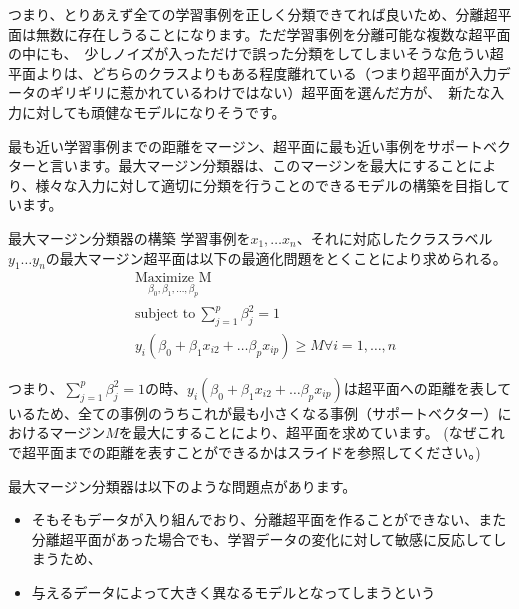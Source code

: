 \documentclass[uplatex]{jsarticle}
\begin{document}
つまり、とりあえず全ての学習事例を正しく分類できてれば良いため、分離超平面は無数に存在しうることになります。ただ学習事例を分離可能な複数な超平面の中にも、\
少しノイズが入っただけで誤った分類をしてしまいそうな危うい超平面よりは、どちらのクラスよりもある程度離れている（つまり超平面が入力データのギリギリに惹かれているわけではない）超平面を選んだ方が、\
新たな入力に対しても頑健なモデルになりそうです。

最も近い学習事例までの距離をマージン、超平面に最も近い事例をサポートベクターと言います。最大マージン分類器は、このマージンを最大にすることにより、様々な入力に対して適切に分類を行うことのできるモデルの構築を目指しています。
\begin{itembox}[l]{最大マージン分類器の構築}
  学習事例を$x_1, \ldots x_n$、それに対応したクラスラベル$y_1 \ldots y_n$の最大マージン超平面は以下の最適化問題をとくことにより求められる。
  \begin{equation*}
    \begin{aligned}
    & \underset{\beta_0, \beta_1, \ldots , \beta_p}{\text{Maximize\ M}} \\
    & \text{subject to}\  \sum_{j=1}^p \beta_j^2 = 1 \\
    & y_i(\beta_0 + \beta_1x_{i2} + \ldots \beta_px_{ip}) \geq M \forall i = 1, \dots, n
    \end{aligned}
  \end{equation*}
\end{itembox}
つまり、$\sum_{j=1}^p \beta_j^2 = 1$の時、$y_i(\beta_0 + \beta_1x_{i2} + \ldots \beta_px_{ip})$は超平面への距離を表しているため、全ての事例のうちこれが最も小さくなる事例（サポートベクター）におけるマージン$M$を最大にすることにより、超平面を求めています。
(なぜこれで超平面までの距離を表すことができるかはスライドを参照してください。)

最大マージン分類器は以下のような問題点があります。
\begin{itemize}
  \item そもそもデータが入り組んでおり、分離超平面を作ることができない、また分離超平面があった場合でも、学習データの変化に対して敏感に反応してしまうため、\
  \item 与えるデータによって大きく異なるモデルとなってしまうという
\end{itemize}
\end{document}
